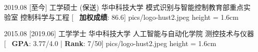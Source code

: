 \begin{educations}
    \education
    {2019.08}
    [至今]
    {工学硕士 (保送)}
    {华中科技大学}
    {模式识别与智能控制教育部重点实验室}
    {控制科学与工程}
    [\textbullet ~ \textbf{加权成绩}: 86.6]
    {pics/logo-hust2.jpeg} {height = 1.6cm}

    \separator{0.5ex}
    \education
    {2015.08}
    [2019.06]
    {工学学士}
    {华中科技大学}
    {人工智能与自动化学院}
    {测控技术与仪器}
    [\textbullet ~ \textbf{GPA}: 3.77/4.0 | \textbf{Rank}: 7/50]
    {pics/logo-hust2.jpeg} {height = 1.6cm}

\end{educations}